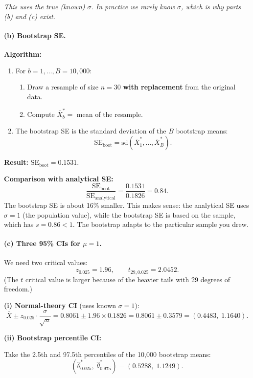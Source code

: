 \documentclass[11pt]{article}
\begin{document}
\textit{This uses the true (known) $\sigma$. In practice we rarely know $\sigma$, which is why parts (b) and (c) exist.}

\paragraph{(b) Bootstrap SE.}

\textbf{Algorithm:}
\begin{enumerate}
  \item For $b = 1, \ldots, B = 10{,}000$:
  \begin{enumerate}
    \item Draw a resample of size $n = 30$ \textbf{with replacement} from the original data.
    \item Compute $\bar{X}^*_b = $ mean of the resample.
  \end{enumerate}
  \item The bootstrap SE is the standard deviation of the $B$ bootstrap means:
  \[
    \text{SE}_{\text{boot}} = \text{sd}(\bar{X}^*_1, \ldots, \bar{X}^*_B).
  \]
\end{enumerate}

\textbf{Result:} $\text{SE}_{\text{boot}} = 0.1531$.

\textbf{Comparison with analytical SE:}
\[
  \frac{\text{SE}_{\text{boot}}}{\text{SE}_{\text{analytical}}} = \frac{0.1531}{0.1826} = 0.84.
\]
The bootstrap SE is about 16\% smaller. This makes sense: the analytical SE uses $\sigma = 1$ (the population value), while the bootstrap SE is based on the sample, which has $s = 0.86 < 1$. The bootstrap adapts to the particular sample you drew.

\paragraph{(c) Three 95\% CIs for $\mu = 1$.}

We need two critical values:
\[
  z_{0.025} = 1.96, \qquad t_{29, 0.025} = 2.0452.
\]
(The $t$ critical value is larger because of the heavier tails with 29 degrees of freedom.)

\medskip

\textbf{(i) Normal-theory CI} (uses known $\sigma = 1$):
\[
  \bar{X} \pm z_{0.025} \cdot \frac{\sigma}{\sqrt{n}}
  = 0.8061 \pm 1.96 \times 0.1826
  = 0.8061 \pm 0.3579
  = (0.4483,\; 1.1640).
\]

\textbf{(ii) Bootstrap percentile CI:}

Take the 2.5th and 97.5th percentiles of the 10,000 bootstrap means:
\[
  (\hat{\theta}^*_{0.025},\; \hat{\theta}^*_{0.975}) = (0.5288,\; 1.1249).
\]
\end{document}

